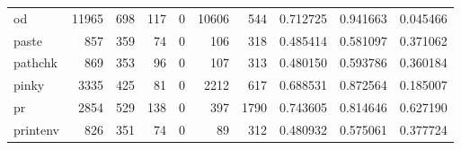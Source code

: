 \begin{tabular}{lrrrrrrrrr}
od        &                               11965 &                                             698 &                                            117 &                                             0 &                                          10606 &                                          544 &                                           0.712725 &                               0.941663 &                             0.045466 \\
paste     &                                 857 &                                             359 &                                             74 &                                             0 &                                            106 &                                          318 &                                           0.485414 &                               0.581097 &                             0.371062 \\
pathchk   &                                 869 &                                             353 &                                             96 &                                             0 &                                            107 &                                          313 &                                           0.480150 &                               0.593786 &                             0.360184 \\
pinky     &                                3335 &                                             425 &                                             81 &                                             0 &                                           2212 &                                          617 &                                           0.688531 &                               0.872564 &                             0.185007 \\
pr        &                                2854 &                                             529 &                                            138 &                                             0 &                                            397 &                                         1790 &                                           0.743605 &                               0.814646 &                             0.627190 \\
printenv  &                                 826 &                                             351 &                                             74 &                                             0 &                                             89 &                                          312 &                                           0.480932 &                               0.575061 &                             0.377724 \\

\end{tabular}
